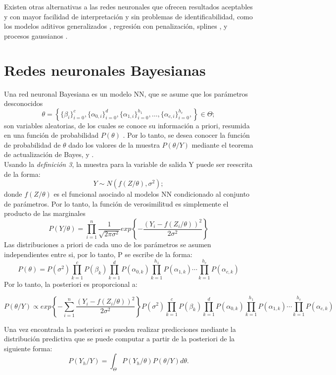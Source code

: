\documentclass[nojss]{jss}
\begin{document}
Existen otras alternativas a las redes neuronales que ofrecen resultados aceptables y con mayor facilidad de interpretación y sin problemas de identificabilidad, como los modelos aditivos generalizados \cite{Rigby2005}, regresión con penalización, splines \cite{Silverman1985}, y procesos gaussianos \cite{gramacy2020surrogates}.  
 
\section{Redes neuronales Bayesianas} 
 
 Una red neuronal Bayesiana es un modelo NN, que se asume que los parámetros desconocidos $$\theta = \left\{ \{\beta_i\}_{i=0}^{c},\{\alpha_{0,i}\}_{i=0}^{d},\{\alpha_{1,i}\}_{i=0}^{h_1},\ldots, \{\alpha_{c,i}\}_{i=0}^{h_c}, \right\} \in \Theta;$$ 
son variables aleatorias, de los cuales se conoce su información a priori, resumida en una función de probabilidad $P(\theta)$ \cite{Bhat2006}. Por lo tanto, se desea conocer la función de probabilidad de $\theta$ dado los valores de la muestra $P(\theta/Y)$ mediante el teorema de actualización de Bayes, \cite{Miggon} y \cite{degroot19886}.\\

Usando la \textit{definición 3}, la muestra para la variable de salida Y puede ser reescrita de la forma:
$$Y \sim N(f(Z/\theta),\sigma^2);$$
donde $f(Z/ \theta)$ es el funcional asociado al modelos NN condicionado al conjunto de parámetros. Por lo tanto, la función de verosimilitud es simplemente el producto de las marginales
$$P(Y/\theta) = \prod_{i=1}^n\dfrac{1}{\sqrt{2\pi\sigma^2}}exp \left\{ - \dfrac{(Y_i- f(Z_i/\theta) )^2}{2\sigma^2} \right\}$$
Las distribuciones a priori de cada uno de los parámetros se asumen independientes entre si, por lo tanto, P se escribe de la forma:
 $$P(\theta) = P(\sigma^2)\prod_{k=1}^cP(\beta_k)\prod_{k=1}^d P(\alpha_{0,k})\prod_{k=1}^{h_1} P(\alpha_{1,k})\cdots \prod_{k=1}^{h_c} P(\alpha_{c,k})$$
Por lo tanto, la posteriori es proporcional a:

$$P(\theta/Y) \propto  exp \left\{ - \sum_{i=1}^n\dfrac{(Y_i- f(Z_i/\theta) )^2}{2\sigma^2} \right\}P(\sigma^2)\prod_{k=1}^cP(\beta_k)\prod_{k=1}^d P(\alpha_{0,k})\prod_{k=1}^{h_1} P(\alpha_{1,k})\cdots \prod_{k=1}^{h_c} P(\alpha_{c,k})$$ 
 
Una vez encontrada la posteriori se pueden realizar predicciones mediante la distribución  predictiva que se puede computar a partir de la posteriori de la siguiente forma:
$$P(Y_h/Y) = \int_{\Theta}P(Y_h/\theta)P(\theta/Y)d\theta.$$
\end{document}
